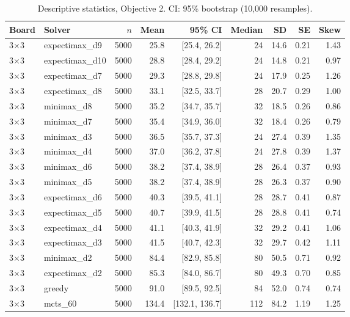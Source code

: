 {\footnotesize
\begin{longtable}{llrrrrrrr}
\caption{Descriptive statistics, Objective 2. CI: 95\% bootstrap (10{,}000 resamples).}\label{tab:desc_obj2}\\
\toprule
Board & Solver & $n$ & Mean & 95\% CI & Median & SD & SE & Skew \\
\midrule
\endhead
3$\times$3 & expectimax\_d9 & 5000 & 25.8 & [25.4, 26.2] & 24 & 14.6 & 0.21 & 1.43 \\
3$\times$3 & expectimax\_d10 & 5000 & 28.8 & [28.4, 29.2] & 24 & 14.8 & 0.21 & 0.97 \\
3$\times$3 & expectimax\_d7 & 5000 & 29.3 & [28.8, 29.8] & 24 & 17.9 & 0.25 & 1.26 \\
3$\times$3 & expectimax\_d8 & 5000 & 33.1 & [32.5, 33.7] & 28 & 20.7 & 0.29 & 1.00 \\
3$\times$3 & minimax\_d8 & 5000 & 35.2 & [34.7, 35.7] & 32 & 18.5 & 0.26 & 0.86 \\
3$\times$3 & minimax\_d7 & 5000 & 35.4 & [34.9, 36.0] & 32 & 18.4 & 0.26 & 0.79 \\
3$\times$3 & minimax\_d3 & 5000 & 36.5 & [35.7, 37.3] & 24 & 27.4 & 0.39 & 1.35 \\
3$\times$3 & minimax\_d4 & 5000 & 37.0 & [36.2, 37.8] & 24 & 27.8 & 0.39 & 1.37 \\
3$\times$3 & minimax\_d6 & 5000 & 38.2 & [37.4, 38.9] & 28 & 26.4 & 0.37 & 0.93 \\
3$\times$3 & minimax\_d5 & 5000 & 38.2 & [37.4, 38.9] & 28 & 26.3 & 0.37 & 0.90 \\
3$\times$3 & expectimax\_d6 & 5000 & 40.3 & [39.5, 41.1] & 28 & 28.7 & 0.41 & 0.87 \\
3$\times$3 & expectimax\_d5 & 5000 & 40.7 & [39.9, 41.5] & 28 & 28.8 & 0.41 & 0.74 \\
3$\times$3 & expectimax\_d4 & 5000 & 41.1 & [40.3, 41.9] & 32 & 29.2 & 0.41 & 1.06 \\
3$\times$3 & expectimax\_d3 & 5000 & 41.5 & [40.7, 42.3] & 32 & 29.7 & 0.42 & 1.11 \\
3$\times$3 & minimax\_d2 & 5000 & 84.4 & [82.9, 85.8] & 80 & 50.5 & 0.71 & 0.92 \\
3$\times$3 & expectimax\_d2 & 5000 & 85.3 & [84.0, 86.7] & 80 & 49.3 & 0.70 & 0.85 \\
3$\times$3 & greedy & 5000 & 91.0 & [89.5, 92.5] & 84 & 52.0 & 0.74 & 0.74 \\
3$\times$3 & mcts\_60 & 5000 & 134.4 & [132.1, 136.7] & 112 & 84.2 & 1.19 & 1.25 \\

\end{longtable}}

